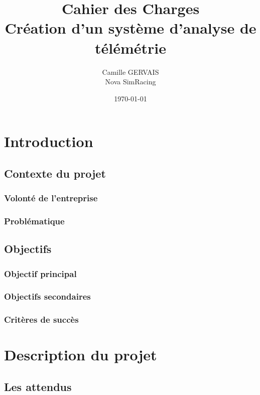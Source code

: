 \documentclass[a4paper,12pt]{report}
\title{\Huge\textbf{Cahier des Charges\\[0.5cm]
        \large Création d'un système d'analyse de télémétrie}}
\author{Camille GERVAIS\\[0.3cm]
        Nova SimRacing}
\date{\today}
\begin{document}
\maketitle
\thispagestyle{empty}

\tableofcontents
\newpage

\chapter{Introduction}
\section{Contexte du projet}

\subsection{Volonté de l'entreprise}

\subsection{Problématique}

\section{Objectifs}

\subsection{Objectif principal}

\subsection{Objectifs secondaires}

\subsection{Critères de succès}

\chapter{Description du projet}

\section{Les attendus}
\end{document}
